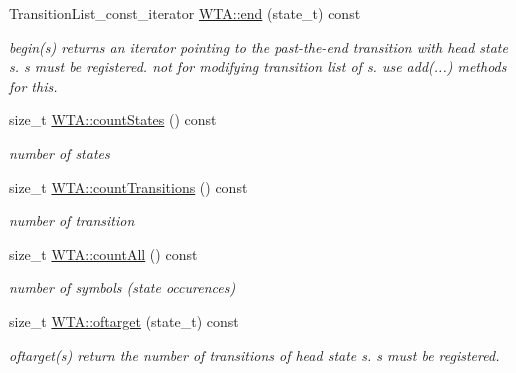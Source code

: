 \begin{DoxyCompactItemize}
\mbox{\label{group__schemata_gaf5075f5a210343d6da208f4c80421cb5}} 
Transition\+List\+\_\+const\+\_\+iterator \mbox{\hyperlink{group__schemata_gaf5075f5a210343d6da208f4c80421cb5}{W\+T\+A\+::end}} (state\+\_\+t) const
\begin{DoxyCompactList}\small\item\em begin(s) returns an iterator pointing to the past-\/the-\/end transition with head state s. s must be registered. not for modifying transition list of s. use add(...) methods for this. \end{DoxyCompactList}\item 
\mbox{\label{group__schemata_ga0f6551b20a213eb88c6a7e822ebc5915}} 
size\+\_\+t \mbox{\hyperlink{group__schemata_ga0f6551b20a213eb88c6a7e822ebc5915}{W\+T\+A\+::count\+States}} () const
\begin{DoxyCompactList}\small\item\em number of states \end{DoxyCompactList}\item 
\mbox{\label{group__schemata_ga8acbd7562a6f69e7634d6b9f9e341e4a}} 
size\+\_\+t \mbox{\hyperlink{group__schemata_ga8acbd7562a6f69e7634d6b9f9e341e4a}{W\+T\+A\+::count\+Transitions}} () const
\begin{DoxyCompactList}\small\item\em number of transition \end{DoxyCompactList}\item 
\mbox{\label{group__schemata_ga9370cdd31619d49bfb0b18fa6b4e13b7}} 
size\+\_\+t \mbox{\hyperlink{group__schemata_ga9370cdd31619d49bfb0b18fa6b4e13b7}{W\+T\+A\+::count\+All}} () const
\begin{DoxyCompactList}\small\item\em number of symbols (state occurences) \end{DoxyCompactList}\item 
\mbox{\label{group__schemata_ga28c9a7e35d4d516ef0f9967e773305f8}} 
size\+\_\+t \mbox{\hyperlink{group__schemata_ga28c9a7e35d4d516ef0f9967e773305f8}{W\+T\+A\+::oftarget}} (state\+\_\+t) const
\begin{DoxyCompactList}\small\item\em oftarget(s) return the number of transitions of head state s. s must be registered. \end{DoxyCompactList}\item 

\end{DoxyCompactItemize}
